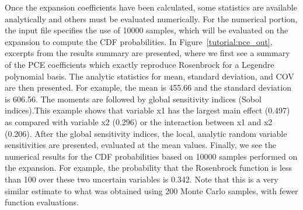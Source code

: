 Once the expansion coefficients have been calculated, some statistics
are available analytically and others must be evaluated numerically.
For the numerical portion, the input file specifies the use of 10000
samples, which will be evaluated on the expansion to compute the CDF
probabilities.  In Figure~\ref{tutorial:pce_out}, excerpts from the results
summary are presented, where we first see a summary of the PCE
coefficients which exactly reproduce Rosenbrock for a Legendre
polynomial basis.  The analytic statistics for mean, standard
deviation, and COV are then presented.  For example, the mean is 455.66 
and the standard deviation is 606.56.  The moments are followed 
by global sensitivity indices (Sobol indices).This example shows that variable 
x1 has the largest main effect (0.497) as compared with variable 
x2 (0.296) or the interaction between x1 and x2 (0.206). 
After the global sensitivity indices, the local, analytic random 
variable sensitivities are presented, evaluated at the mean values.
Finally, we see the numerical results for the CDF probabilities based
on 10000 samples performed on the expansion. For example, 
the probability that the Rosenbrock function is less than 100 
over these two uncertain variables is 0.342. Note that this is a very similar 
estimate to what was obtained using 200 Monte Carlo samples, with 
fewer function evaluations.
